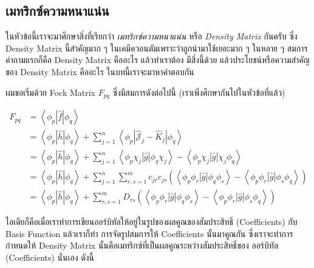 \subsection{เมทริกซ์ความหนาแน่น}

ในหัวข้อนี้เราจะมาศึกษาสิ่งที่เรียกว่า \textit{เมทริกซ์ความหนาแน่น} หรือ \textit{Density Matrix} กันครับ ซึ่ง Density Matrix
นี้สำคัญมาก ๆ ในเคมีควอนตัมเพราะว่าถูกนำมาใช้เยอะมาก ๆ ในหลาย ๆ สมการ คำถามแรกก็คือ Density Matrix คืออะไร แล้วทำเราต้อง%
มีสิ่งนี้ด้วย แล้วประโยชน์หรือความสำคัญของ Density Matrix คืออะไร ในบทนี้เราจะมาหาคำตอบกัน

ผมขอเริ่มด้วย Fock Matrix $F_{p q}$  ซึ่งมีสมการดังต่อไปนี้ (เราเพิ่งศึกษากันไปในหัวข้อที่แล้ว)

\begin{equation}
    \label{eq:Fock_Matrix_Elements}
    \begin{aligned}
        F_{p q}
         & =\left\langle\phi_p|\hat{f}| \phi_q\right\rangle             \\
         & = \left\langle\phi_p|\hat{h}| \phi_q\right\rangle
        + \sum_{j=1}^n
        \left\langle\phi_p\left|\hat{\mathscr{J}}_j
        - \hat{K}_j\right| \phi_q\right\rangle                          \\
         & =\left\langle\phi_p|\hat{h}| \phi_q\right\rangle
        + \sum_{j=1}^n
        \left\langle\phi_p \chi_j|\hat{g}| \phi_q \chi_j\right\rangle
        - \left\langle\phi_p \chi_j|\hat{g}| \chi_j \phi_q\right\rangle \\
         & =\left\langle\phi_p|\hat{h}| \phi_q\right\rangle
        + \sum_{j=1}^n \sum_{r, s=1}^m
        c_{j r} c_{j s}
        \left(
        \left\langle\phi_p \phi_r|\hat{g}| \phi_q \phi_s\right\rangle
        - \left\langle\phi_p \phi_r|\hat{g}| \phi_s \phi_q\right\rangle
        \right)                                                         \\
         & =\left\langle\phi_p|\hat{h}| \phi_q\right\rangle
        + \sum_{r, s=1}^m D_{r s}
        \left(
        \left\langle\phi_p \phi_r|\hat{g}| \phi_q \phi_s\right\rangle
        - \left\langle\phi_p \phi_r|\hat{g}| \phi_s \phi_q\right\rangle
        \right)
    \end{aligned}
\end{equation}

\noindent ไอเดียก็คือเมื่อเราทำการเขียนออร์บิทัลให้อยู่ในรูปของผลคูณของสัมประสิทธิ์ (Coefficients) กับ Basis Function แล้วเราก็ทำ%
การจัดรูปสมการให้ Coefficients นั้นมาคูณกัน ซึ่งเราจะทำการกำหนดให้ Density Matrix นั้นคือเมทริกซ์ที่เป็นผลคูณระหว่างสัมประสิทธิ์ของ%
ออร์บิทัล (Coefficients) นั่นเอง ดังนี้

